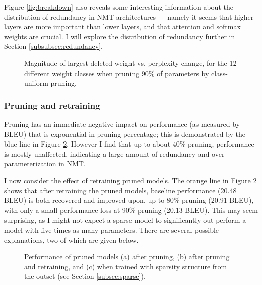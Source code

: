 Figure \ref{fig:breakdown} also reveals some interesting information about the
distribution of redundancy in NMT architectures --- namely it seems that higher
layers are more important than lower layers, and that attention and softmax
weights are crucial. I will explore the distribution of redundancy further in
Section \ref{subsubsec:redundancy}.

\begin{figure}
\centering

\caption[Magnitude of largest deleted weight vs. perplexity change]{Magnitude of largest deleted weight vs. perplexity change, for the 12
different weight classes when pruning 90\% of parameters by class-uniform
pruning.}
\label{fig:scatter}
\end{figure}

\subsubsection{Pruning and retraining}
\label{subsec:effect}


Pruning has an immediate negative impact on performance (as measured by BLEU) that is exponential in pruning percentage; this is demonstrated by the blue line in Figure \ref{fig:main_results}.
However I find that up to about 40\% pruning, performance is mostly unaffected, indicating a large amount of redundancy and over-parameterization in NMT.

I now consider the effect of retraining pruned models.
The orange line in Figure \ref{fig:main_results} shows that after retraining the pruned models, baseline performance (20.48 BLEU) is both recovered and improved upon, up to 80\% pruning (20.91 BLEU), with only a small performance loss at 90\% pruning (20.13 BLEU).
This may seem surprising, as I might not expect a sparse model to significantly out-perform a model with five times as many parameters.
There are several possible explanations, two of which are given below.
\begin{figure}
\centering

\caption[Performance of pruned models]{Performance of pruned models (a) after pruning, (b) after pruning and
retraining, and (c) when trained with sparsity structure from the outset (see
Section \ref{subsec:sparse}).}
\label{fig:main_results}
\end{figure}

